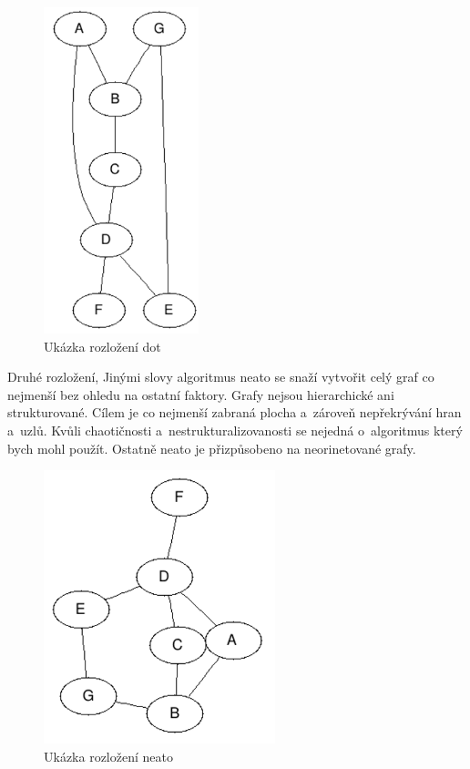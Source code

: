 \documentclass[color,table,oneside,nolot,nolof]{fithesis}
\begin{document}
\begin{figure}[h!]
	\label{fig:Ukázka rozložení dot}
	\caption{Ukázka rozložení dot}
	\centering
	\includegraphics[width=0.4\textwidth]{pictures/dot_example.png} 
\end{figure}

	Druhé rozložení, \cite{graphviz_layout}
	Jinými slovy algoritmus neato se snaží vytvořit celý graf co nejmenší bez ohledu na ostatní faktory. Grafy nejsou hierarchické ani 
	strukturované. Cílem je co nejmenší zabraná plocha a~zároveň nepřekrývání hran a~uzlů. Kvůli chaotičnosti a~nestrukturalizovanosti se nejedná o~algoritmus který bych mohl
	použít. Ostatně neato je přizpůsobeno na neorinetované grafy.

\begin{figure}
	\label{fig:Ukázka rozložení neato}
	\caption{Ukázka rozložení neato}
	\centering
	\includegraphics[width=0.6\textwidth]{pictures/neato_example.png} 
\end{figure}
\end{document}

